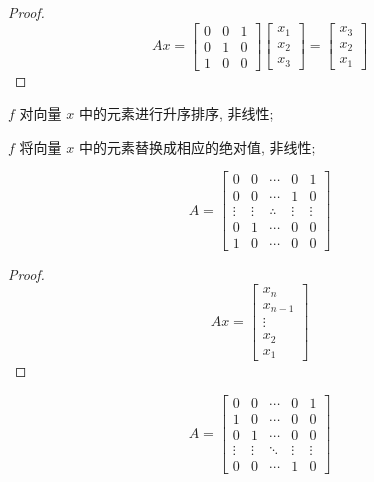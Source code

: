 \begin{proof}
    $$ A x=\left[\begin{array}{lll}0 & 0 & 1 \\ 0 & 1 & 0 \\ 1 & 0 & 0\end{array}\right]\left[\begin{array}{l}x_{1} \\ x_{2} \\ x_{3}\end{array}\right]=\left[\begin{array}{l}x_{3} \\ x_{2} \\ x_{1}\end{array}\right] $$
\end{proof}

\begin{example}
    $ f $ 对向量 $ x $ 中的元素进行升序排序, 非线性;
\end{example}

\begin{example}
    $ f $ 将向量 $ x $ 中的元素替换成相应的绝对值, 非线性;
\end{example}

\begin{example}[反转矩阵]
    $$ A=\left[\begin{array}{ccccc}0 & 0 & \cdots & 0 & 1 \\ 0 & 0 & \cdots & 1 & 0 \\ \vdots & \vdots & \therefore & \vdots & \vdots \\ 0 & 1 & \cdots & 0 & 0 \\ 1 & 0 & \cdots & 0 & 0\end{array}\right] $$
\end{example}

\begin{proof}
    $$ A x=\left[\begin{array}{c}x_{n} \\ x_{n-1} \\ \vdots \\ x_{2} \\ x_{1}\end{array}\right] $$
\end{proof}

\begin{example}[循环移位矩阵]
    $$ A=\left[\begin{array}{ccccc}0 & 0 & \cdots & 0 & 1 \\ 1 & 0 & \cdots & 0 & 0 \\ 0 & 1 & \cdots & 0 & 0 \\ \vdots & \vdots & \ddots & \vdots & \vdots \\ 0 & 0 & \cdots & 1 & 0\end{array}\right] $$
\end{example}

